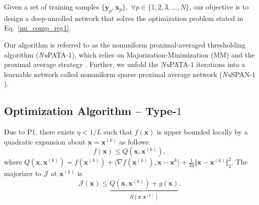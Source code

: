 \documentclass[journal]{IEEEtran}
\begin{document}
Given a set of training samples $\{\boldsymbol{y}_p, \boldsymbol{x}_p\}, \, \, \forall p \in \{1, 2, 3, \ldots , N\}$, our objective is to design a deep-unrolled network that solves the optimization problem stated in Eq.~\eqref{nu_comp_reg1}.

Our algorithm is referred to as the nonuniform proximal-averaged thresholding algorithm ({\it Nu}PATA-$1$), which relies on Majorization-Minimization (MM) \cite{figueiredo2007majorization} and the proximal average strategy \cite{bauschke2008proximal, yu2013better, jawali2020cornet}. Further, we unfold the {\it Nu}PATA-$1$ iterations into a learnable network called nonuniform sparse proximal average network ({\it Nu}SPAN-$1$).

\subsection{Optimization Algorithm -- Type-\texorpdfstring{$1$}{1}}
\label{subsec:nupata1}

Due to P1, there exists $\eta < 1/L$ such that $f(\boldsymbol{x})$ is upper bounded locally by a quadratic expansion about $\boldsymbol{x} = \boldsymbol{x}^{(k)}$ as follows:
\begin{equation}
f(\boldsymbol{x}) \leq Q\left(\boldsymbol{x},\boldsymbol{x}^{(k)}\right),
\end{equation}
where $Q(\boldsymbol{x},\boldsymbol{x}^{(k)}) = f(\boldsymbol{x}^{(k)}) + \langle \nabla f(\boldsymbol{x}^{(k)}) , \boldsymbol{x}-\boldsymbol{x}^{k} \rangle + \frac{1}{2\eta} \Vert\boldsymbol{x}- \boldsymbol{x}^{(k)}\Vert_{2}^{2}$. The majorizer to $\mathcal{J}$ at $\boldsymbol{x}^{(k)}$ is 
\begin{equation}
\mathcal{J}(\boldsymbol{x}) \leq \underbrace{Q(\boldsymbol{x},\boldsymbol{x}^{(k)}) + g(\boldsymbol{x})}_{H(\boldsymbol{x},\boldsymbol{x}^{(k)})}.
\end{equation}
\end{document}
